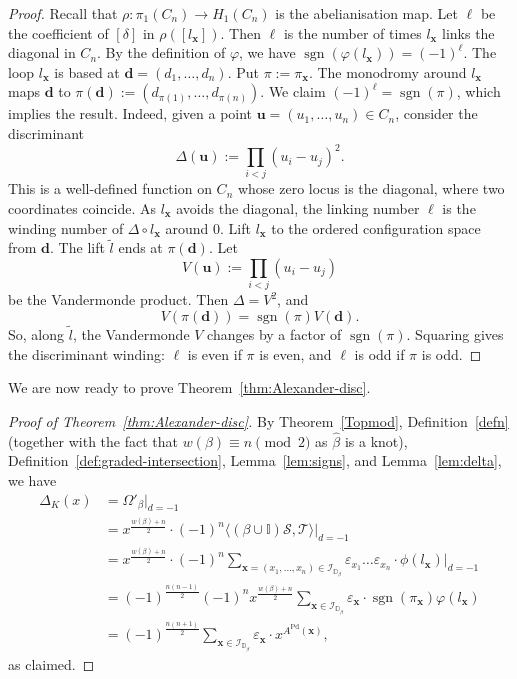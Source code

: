 \documentclass[11pt]{amsart}
\numberwithin{equation}{section}
\numberwithin{figure}{section}
\theoremstyle{definition}
\newcommand{\cI}{\mathcal{I}}
\newcommand{\cs}{\mathscr{S}}
\newcommand{\ct}{\mathscr{T}}
\newcommand{\bD}{\mathbb{D}}
\newcommand{\ds}{\boldsymbol{d}}
\DeclareMathOperator{\sgn}{\text{sgn}}
\DeclareMathOperator{\Pd}{Pd}
\newcommand{\us}{\boldsymbol{u}}
\newcommand{\xs}{\boldsymbol{x}}
\begin{document}
\begin{proof}
    Recall that $\rho \colon \pi_1(C_n) \to H_1(C_n)$ is the abelianisation map. Let $\ell$ be the coefficient of $[\delta]$ in $\rho([l_{\xs}])$. Then $\ell$ is the number of times $l_{\xs}$ links the diagonal in $C_n$. By the definition of $\varphi$, we have $\sgn(\varphi(l_{\xs})) = (-1)^\ell$. The loop $l_{\xs}$ is based at $\ds = (d_1,\dots,d_n)$. Put $\pi := \pi_{\xs}$. The monodromy around $l_{\xs}$ maps $\ds$ to $\pi(\ds) := (d_{\pi(1)},\dots,d_{\pi(n)})$. We claim $(-1)^\ell = \sgn(\pi)$, which implies the result. Indeed, given a point $\us = (u_1,\dots,u_n) \in C_n$, consider the discriminant 
    \[
    \Delta(\us) := \prod_{i<j}(u_i-u_j)^2.
    \]
    This is a well-defined function on $C_n$ whose zero locus is the diagonal, where two coordinates coincide. As $l_{\xs}$ avoids the diagonal, the linking number $\ell$ is the winding number of $\Delta \circ l_{\xs}$ around 0. Lift $l_{\xs}$ to the ordered configuration space from $\ds$. The lift $\tilde{l}$ ends at $\pi(\ds)$. Let 
    \[
    V(\us) := \prod_{i<j} (u_i-u_j)
    \]
    be the Vandermonde product. Then $\Delta = V^2$, and
    \[
    V(\pi(\ds)) = \sgn(\pi) V(\ds).
    \]
    So, along $\tilde{l}$, the Vandermonde $V$ changes by a factor of $\sgn(\pi)$. Squaring gives the discriminant winding: $\ell$ is even if $\pi$ is even, and $\ell$ is odd if $\pi$ is odd.
\end{proof}

We are now ready to prove Theorem~\ref{thm:Alexander-disc}.

\begin{proof}[Proof of Theorem~\ref{thm:Alexander-disc}]
    By Theorem~\ref{Topmod}, Definition~\ref{defn} (together with the fact that $w(\beta) \equiv n \pmod 2$ as $\hat{\beta}$ is a knot), Definition~\ref{def:graded-intersection}, Lemma~\ref{lem:signs}, and Lemma~\ref{lem:delta}, we have 
    \[
    \begin{split}
    {\Delta_K(x)} &=\Omega'_\beta|_{d=-1} \\
    &= x^{\frac{w(\beta)+n}{2}} \cdot (-1)^n \langle  (\beta \cup \mathbb I) \cs, \ct \rangle|_{d=-1} \\
    &= x^{\frac{w(\beta)+n}{2}} \cdot (-1)^n \sum_{\xs = (x_1,\dots,x_n)\in \cI_{\bD_\beta}} \varepsilon_{x_1} \dots \varepsilon_{x_n} \cdot \phi(l_{\xs})|_{d=-1} \\
    &= (-1)^{\frac{n(n-1)}{2}} (-1)^n x^{\frac{w(\beta)+n}{2}} \sum_{\xs \in \cI_{\bD_\beta}} \varepsilon_{\xs} \cdot \sgn(\pi_{\xs}) \varphi(l_{\xs}) \\
    &= (-1)^{\frac{n(n+1)}{2}} \sum_{\xs \in \cI_{\bD_\beta}} \varepsilon_{\xs} \cdot x^{A^{\Pd}(\xs)},
    \end{split}
    \]
    as claimed.
\end{proof}
\end{document}
